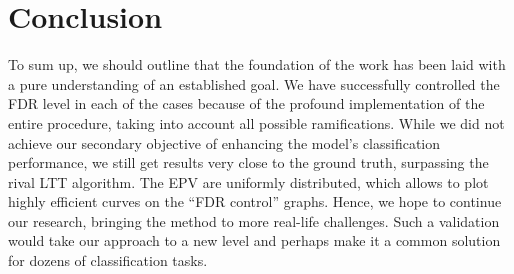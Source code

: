 \documentclass{article}
\begin{document}
\section{Conclusion}

To sum up, we should outline that the foundation of the work has been laid with a pure understanding of an established goal. We have successfully controlled the FDR level in each of the cases because of the profound implementation of the entire procedure, taking into account all possible ramifications. While we did not achieve our secondary objective of enhancing the model’s classification performance, we still get results very close to the ground truth, surpassing the rival LTT algorithm. The EPV are uniformly distributed, which allows to plot highly efficient curves on the “FDR control” graphs. Hence, we hope to continue our research, bringing the method to more real-life challenges. Such a validation would take our approach to a new level and perhaps make it a common solution for dozens of classification tasks.
\end{document}
